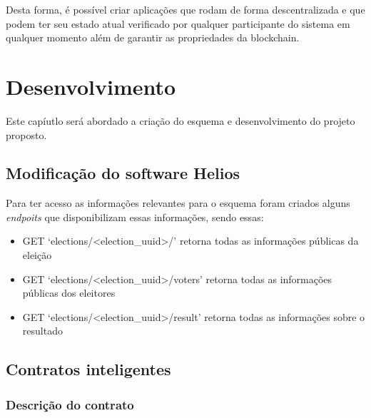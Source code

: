\documentclass{ufsctex/ufsctex}
\begin{document}
Desta forma, é possível criar aplicações que rodam de forma descentralizada e
que podem ter seu estado atual verificado por qualquer participante do sistema
em qualquer momento além de garantir as propriedades da blockchain.

\chapter{Desenvolvimento}
Este capíutlo será abordado a criação do esquema e desenvolvimento do projeto proposto.

\section{Modificação do software Helios}
Para ter acesso as informações relevantes para o esquema foram criados alguns \textit{endpoits}
que disponibilizam essas informações, sendo essas:

\begin{itemize}
	\item GET `elections/<election\_uuid>/' retorna todas as informações públicas da eleição
	\item GET `elections/<election\_uuid>/voters' retorna todas as informações públicas dos eleitores
	\item GET `elections/<election\_uuid>/result' retorna todas as informações sobre o resultado
\end{itemize}

\section{Contratos inteligentes}

\subsection{Descrição do contrato}
\end{document}
